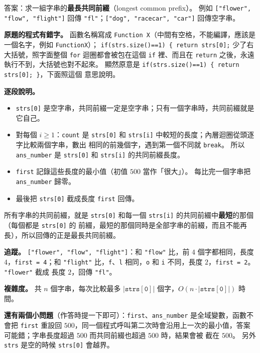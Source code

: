\begin{pastsoln}
答案：求一組字串的\textbf{最長共同前綴}（longest common prefix）。 例如 \texttt{["flower", "flow", "flight"]} 回傳
\texttt{"fl"}；\texttt{["dog", "racecar", "car"]} 回傳空字串。

\textbf{原題的程式有錯字。} 函數名稱寫成 \texttt{Function X}（中間有空格，不能編譯，應該是一個名字，例如 \texttt{FunctionX}）；
\texttt{if(strs.size()==1) \{ return strs[0];} 少了右大括號，照字面整個 \texttt{for} 迴圈都會被包在這個 \texttt{if} 裡、而且在
\texttt{return} 之後，永遠執行不到，大括號也對不起來。 顯然原意是 \texttt{if(strs.size()==1) \{ return strs[0]; \}}，下面照這個
意思說明。

\textbf{逐段說明。}
\begin{itemize}
\item \texttt{strs[0]} 是空字串，共同前綴一定是空字串；只有一個字串時，共同前綴就是它自己。
\item 對每個 $i \ge 1$：\texttt{count} 是 \texttt{strs[0]} 和 \texttt{strs[i]} 中較短的長度；內層迴圈從頭逐字比較兩個字串，數出
相同的前幾個字，遇到第一個不同就 \texttt{break}。 所以 \texttt{ans\_number} 是 \texttt{strs[0]} 和 \texttt{strs[i]} 的共同前綴長度。
\item \texttt{first} 記錄這些長度的最小值（初值 $500$ 當作「很大」）。 每比完一個字串把 \texttt{ans\_number} 歸零。
\item 最後把 \texttt{strs[0]} 截成長度 \texttt{first} 回傳。
\end{itemize}
所有字串的共同前綴，就是 \texttt{strs[0]} 和每一個 \texttt{strs[i]} 的共同前綴中\textbf{最短}的那個（每個都是 \texttt{strs[0]} 的
前綴，最短的那個同時是全部字串的前綴，而且不能再長），所以回傳的正是最長共同前綴。

\textbf{追蹤。} \texttt{["flower", "flow", "flight"]}：和 \texttt{"flow"} 比，前 $4$ 個字都相同，長度 $4$，\texttt{first = 4}；和
\texttt{"flight"} 比，\texttt{f}、\texttt{l} 相同，\texttt{o} 和 \texttt{i} 不同，長度 $2$，\texttt{first = 2}。 \texttt{"flower"} 截成
長度 $2$，回傳 \texttt{"fl"}。

\textbf{複雜度。} 共 $n$ 個字串，每次比較最多 $|\mathtt{strs[0]}|$ 個字，$O(n \cdot |\mathtt{strs[0]}|)$ 時間。

\textbf{還有兩個小問題}（作答時提一下即可）：\texttt{first}、\texttt{ans\_number} 是全域變數，函數不會把 \texttt{first} 重設回
$500$，同一個程式呼叫第二次時會沿用上一次的最小值，答案可能錯；字串長度超過 $500$ 而共同前綴也超過 $500$ 時，結果會被
截在 $500$。 另外 \texttt{strs} 是空的時候 \texttt{strs[0]} 會越界。
\end{pastsoln}
